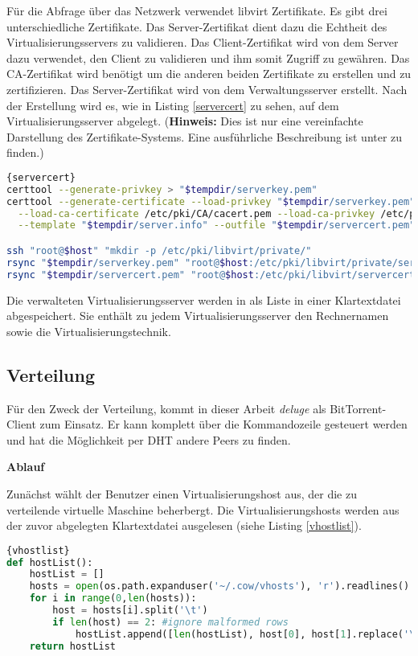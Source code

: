Für die Abfrage über das Netzwerk verwendet libvirt Zertifikate. Es gibt drei unterschiedliche Zertifikate. Das Server-Zertifikat dient dazu die Echtheit des Virtualisierungsservers zu validieren. Das Client-Zertifikat wird von dem Server dazu verwendet, den Client zu validieren und ihm somit Zugriff zu gewähren. Das CA-Zertifikat wird benötigt um die anderen beiden Zertifikate zu erstellen und zu zertifizieren. Das Server-Zertifikat wird von dem Verwaltungsserver erstellt. Nach der Erstellung wird es, wie in Listing \ref{servercert} zu sehen, auf dem Virtualisierungsserver abgelegt. (\textbf{Hinweis:} Dies ist nur eine vereinfachte Darstellung des Zertifikate-Systems. Eine ausführliche Beschreibung ist unter \cite{libvirttls} zu finden.) 
\\
\begin{lstlisting}[caption=Erstellung des Serverzertifikats für den Virtualisierungsserver,language=Bash,label=servercert]{servercert}
certtool --generate-privkey > "$tempdir/serverkey.pem"
certtool --generate-certificate --load-privkey "$tempdir/serverkey.pem" \
  --load-ca-certificate /etc/pki/CA/cacert.pem --load-ca-privkey /etc/pki/CA/private/cakey.pem \
  --template "$tempdir/server.info" --outfile "$tempdir/servercert.pem" 2> "/var/log/cow.log"

ssh "root@$host" "mkdir -p /etc/pki/libvirt/private/"
rsync "$tempdir/serverkey.pem" "root@$host:/etc/pki/libvirt/private/serverkey.pem"
rsync "$tempdir/servercert.pem" "root@$host:/etc/pki/libvirt/servercert.pem"
\end{lstlisting}

Die verwalteten Virtualisierungsserver werden in als Liste in einer Klartextdatei abgespeichert. Sie enthält zu jedem Virtualisierungsserver den Rechnernamen sowie die Virtualisierungstechnik. \label{vhosts}

\subsection{Verteilung}
Für den Zweck der Verteilung, kommt in dieser Arbeit \textit{deluge} als BitTorrent-Client zum Einsatz. Er kann komplett über die Kommandozeile gesteuert werden und hat die Möglichkeit per DHT andere Peers zu finden.

\textbf{Ablauf}

Zunächst wählt der Benutzer einen Virtualisierungshost aus, der die zu verteilende virtuelle Maschine beherbergt. Die Virtualisierungshosts werden aus der zuvor abgelegten Klartextdatei ausgelesen (siehe Listing \ref{vhostlist}).
\\
\begin{lstlisting}[caption=Auslesen der registrierten Virtualisierungshosts,language=Python,label=vhostlist]{vhostlist}
def hostList():
	hostList = []
	hosts = open(os.path.expanduser('~/.cow/vhosts'), 'r').readlines()
	for i in range(0,len(hosts)):
		host = hosts[i].split('\t')
		if len(host) == 2: #ignore malformed rows
			hostList.append([len(hostList), host[0], host[1].replace('\n','')])
	return hostList
\end{lstlisting}

